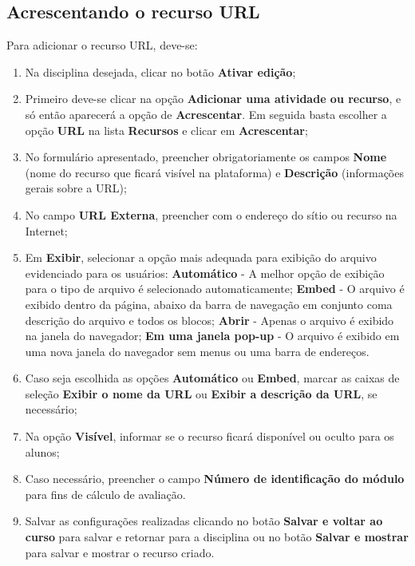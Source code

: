 \subsection{Acrescentando o recurso URL}
Para adicionar o recurso URL, deve-se:
\begin{enumerate}
\item Na disciplina desejada, clicar no botão  \textbf{Ativar edição};
\item Primeiro deve-se clicar na opção \textbf{Adicionar uma atividade ou recurso}, e só então aparecerá a opção de \textbf{Acrescentar}. Em seguida basta escolher a opção \textbf{URL} na lista \textbf{Recursos} e clicar em \textbf{Acrescentar};
\item No formulário apresentado, preencher obrigatoriamente os campos \textbf{Nome} (nome do recurso que ficará visível na plataforma) e \textbf{Descrição} (informações gerais sobre a URL);
\item No campo \textbf{URL Externa}, preencher com o endereço do sítio ou recurso na Internet;
\item Em \textbf{Exibir}, selecionar a opção mais adequada para exibição do arquivo evidenciado para os usuários:
\subitem \textbf{Automático} - A melhor opção de exibição para o tipo de arquivo é selecionado automaticamente;
\subitem \textbf{Embed} - O arquivo é exibido dentro da página, abaixo da barra de navegação em conjunto coma descrição do arquivo e todos os blocos;
\subitem \textbf{Abrir} - Apenas o arquivo é exibido na janela do navegador;
\subitem \textbf{Em uma janela pop-up} - O arquivo é exibido em uma nova janela do navegador sem menus ou uma barra de endereços.
\item Caso seja escolhida as opções \textbf{Automático} ou \textbf{Embed}, marcar as caixas de seleção \textbf{Exibir o nome da URL} ou \textbf{Exibir a descrição da URL}, se necessário;
\item Na opção \textbf{Visível}, informar se o recurso ficará disponível ou oculto para os alunos;
\item Caso necessário, preencher o campo \textbf{Número de identificação do módulo} para fins de cálculo de avaliação.
\item Salvar as configurações realizadas clicando no botão \textbf{Salvar e voltar ao curso}  para salvar e retornar para a disciplina ou no botão \textbf{Salvar e mostrar}  para salvar e mostrar o recurso criado.
\end{enumerate}

